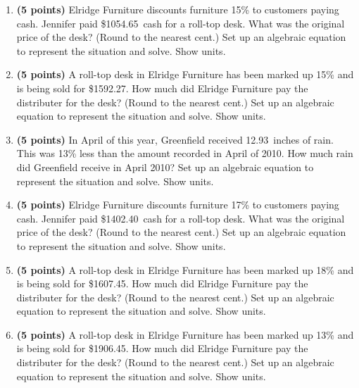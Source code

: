 \documentclass[12pt]{amsart}
\begin{document}
\begin{enumerate}
\vfill 
\def \discount{15}\def \paid{1054.65}\def \rainy{10.31}\def \orcost{1240.76}\def \purcost{917.09}\def \orrainy{12.13}
\item {\bf (5 points)} 
 Elridge Furniture discounts furniture \discount\% to customers paying cash. Jennifer paid \$\paid\ cash for a roll-top desk. What was the original price of the desk? (Round to the nearest cent.) Set up an algebraic equation to represent the situation and solve. Show units.

\vfill 
\def \discount{15}\def \paid{1592.27}\def \rainy{15.17}\def \orcost{1873.26}\def \purcost{1384.58}\def \orrainy{17.85}
\item {\bf (5 points)} 
 A roll-top desk in Elridge Furniture has been marked up \discount\% and is being sold for \$\paid. How much did Elridge Furniture pay the distributer for the desk? (Round to the nearest cent.) Set up an algebraic equation to represent the situation and solve. Show units.

\vfill 
\def \discount{13}\def \paid{1984.88}\def \rainy{12.93}\def \orcost{2281.47}\def \purcost{1756.53}\def \orrainy{14.86}
\item {\bf (5 points)} 
 In April of this year, Greenfield received \rainy\ inches of rain. This was \discount\% less than the amount recorded in April of 2010. How much rain did Greenfield  receive in April 2010? Set up an algebraic equation to represent the situation and solve. Show units.

\vfill 
\def \discount{17}\def \paid{1402.40}\def \rainy{13.66}\def \orcost{1689.64}\def \purcost{1198.63}\def \orrainy{16.46}
\item {\bf (5 points)} 
 Elridge Furniture discounts furniture \discount\% to customers paying cash. Jennifer paid \$\paid\ cash for a roll-top desk. What was the original price of the desk? (Round to the nearest cent.) Set up an algebraic equation to represent the situation and solve. Show units.

\vfill 
\def \discount{18}\def \paid{1607.45}\def \rainy{14.73}\def \orcost{1960.30}\def \purcost{1362.25}\def \orrainy{17.96}
\item {\bf (5 points)} 
 A roll-top desk in Elridge Furniture has been marked up \discount\% and is being sold for \$\paid. How much did Elridge Furniture pay the distributer for the desk? (Round to the nearest cent.) Set up an algebraic equation to represent the situation and solve. Show units.

\vfill 
\def \discount{13}\def \paid{1906.45}\def \rainy{9.24}\def \orcost{2191.32}\def \purcost{1687.12}\def \orrainy{10.62}
\item {\bf (5 points)} 
 A roll-top desk in Elridge Furniture has been marked up \discount\% and is being sold for \$\paid. How much did Elridge Furniture pay the distributer for the desk? (Round to the nearest cent.) Set up an algebraic equation to represent the situation and solve. Show units.


\end{enumerate}
\end{document}
